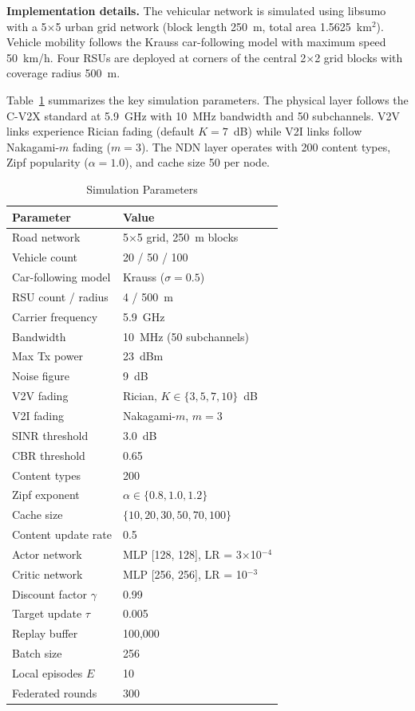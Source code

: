 \documentclass[journal]{IEEEtran}
\begin{document}
\textbf{Implementation details.} The vehicular network is simulated using libsumo with a 5$\times$5 urban grid network (block length 250~m, total area 1.5625~km$^2$). Vehicle mobility follows the Krauss car-following model with maximum speed 50~km/h. Four RSUs are deployed at corners of the central 2$\times$2 grid blocks with coverage radius 500~m.

Table~\ref{tab:sim_params} summarizes the key simulation parameters. The physical layer follows the C-V2X standard at 5.9~GHz with 10~MHz bandwidth and 50 subchannels. V2V links experience Rician fading (default $K = 7$~dB) while V2I links follow Nakagami-$m$ fading ($m = 3$). The NDN layer operates with 200 content types, Zipf popularity ($\alpha = 1.0$), and cache size 50 per node.

\begin{table}[!t]
\centering
\caption{Simulation Parameters}
\label{tab:sim_params}
\begin{tabular}{l l}
\toprule
\textbf{Parameter} & \textbf{Value} \\
\midrule
Road network & 5$\times$5 grid, 250~m blocks \\
Vehicle count & 20 / 50 / 100 \\
Car-following model & Krauss ($\sigma = 0.5$) \\
RSU count / radius & 4 / 500~m \\
Carrier frequency & 5.9~GHz \\
Bandwidth & 10~MHz (50 subchannels) \\
Max Tx power & 23~dBm \\
Noise figure & 9~dB \\
V2V fading & Rician, $K \in \{3, 5, 7, 10\}$~dB \\
V2I fading & Nakagami-$m$, $m = 3$ \\
SINR threshold & 3.0~dB \\
CBR threshold & 0.65 \\
Content types & 200 \\
Zipf exponent & $\alpha \in \{0.8, 1.0, 1.2\}$ \\
Cache size & $\{10, 20, 30, 50, 70, 100\}$ \\
Content update rate & 0.5 \\
Actor network & MLP [128, 128], LR = 3$\times$10$^{-4}$ \\
Critic network & MLP [256, 256], LR = 10$^{-3}$ \\
Discount factor $\gamma$ & 0.99 \\
Target update $\tau$ & 0.005 \\
Replay buffer & 100,000 \\
Batch size & 256 \\
Local episodes $E$ & 10 \\
Federated rounds & 300 \\
\bottomrule
\end{tabular}
\end{table}
\end{document}
